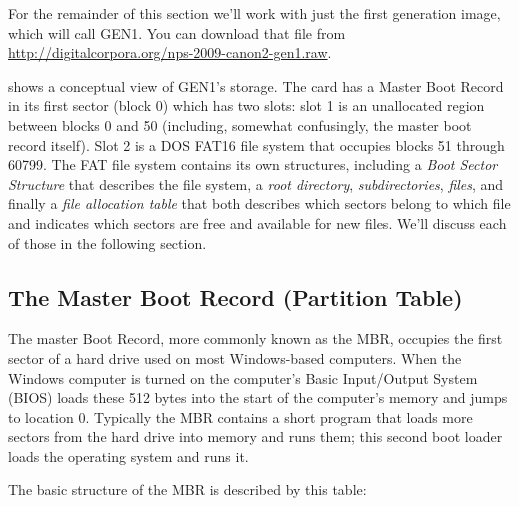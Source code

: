 For the remainder of this section we'll work with just the first
generation image, which will call GEN1. You can download that file
from \url{http://digitalcorpora.org/nps-2009-canon2-gen1.raw}.


 shows a conceptual view of
GEN1's storage. The card has a Master Boot Record in its
first sector (block 0) which has two slots: slot 1 is an unallocated
region between blocks 0 and 50 (including, somewhat confusingly, the
master boot record itself). Slot 2 is a DOS FAT16 file system that
occupies blocks 51 through 60799. The FAT file system contains its own
structures, including a \emph{Boot Sector Structure} that describes the
file system, a \emph{root directory}, \emph{subdirectories},
\emph{files}, and finally a \emph{file allocation table} that both
describes which sectors belong to which file and indicates which
sectors are free and available for new files. We'll discuss each of
those in the following section.

\subsection{The Master Boot Record (Partition Table)}

The master Boot Record, more commonly known as the MBR, occupies the first
sector of a hard drive used on most Windows-based computers. When the
Windows computer is turned on the computer's Basic Input/Output
System (BIOS) loads these 512 bytes into the start of the computer's
memory and jumps to location 0. Typically the MBR contains a short
program that loads more sectors from the hard drive into memory and
runs them; this second boot loader loads the operating system and runs
it.

The basic structure of the MBR is described by this table:


